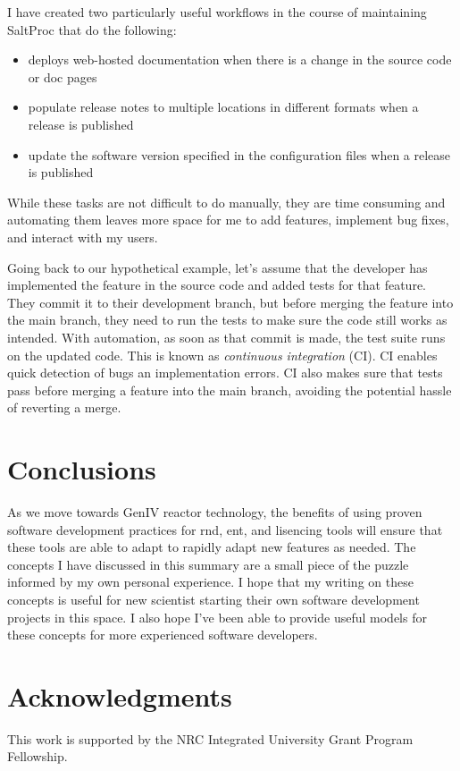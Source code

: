 \documentclass{anstrans}
\begin{document}
     I have created two particularly useful workflows in the course of maintaining SaltProc that do the following:
     \begin{itemize}
         \item deploys web-hosted documentation when there is a change in the source code or doc pages
         \item populate release notes to multiple locations in different formats when a release is published
         \item update the software version specified in the configuration files when a release is published
     \end{itemize}
     While these tasks are not difficult to do manually, they are time consuming and automating them leaves more space for me to add features, implement bug fixes, and interact with my users.
    
    Going back to our hypothetical example, let's assume that the developer has implemented the feature in the source code and added tests for that feature. They commit it to their development branch, but before merging the feature into the main branch, they need to run the tests to make sure the code still works as intended. With automation, as soon as that commit is made, the test suite runs on the updated code. This is known as {\it continuous integration} (CI). CI enables quick detection of bugs an implementation errors. CI also makes sure that tests pass before merging a feature into the main branch, avoiding the potential hassle of reverting a merge.
    

\section{Conclusions}

    As we move towards GenIV reactor technology, the benefits of using proven software development practices for \Gls{rnd}, \Gls{ent}, and lisencing tools will ensure that these tools are able to adapt to rapidly adapt new features as needed. The concepts I have discussed in this summary are a small piece of the puzzle informed by my own personal experience. I hope that my writing on these concepts is useful for new scientist starting their own software development projects in this
    space. I also hope I've been able to provide useful models for these concepts for more experienced software developers. 

\section{Acknowledgments}
This work is supported by the NRC Integrated University Grant Program Fellowship.



\end{document}
